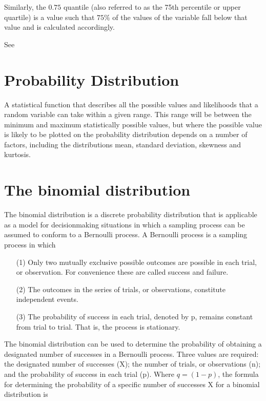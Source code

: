 \documentclass[12pt]{report}
\begin{document}
Similarly, the $0.75$ quantile (also referred to as the 75th percentile or upper quartile) is a value such that $75\%$ of the values of the variable fall below that value and is calculated accordingly.

See



\section{Probability Distribution}

A statistical function that describes all the possible values and likelihoods that a random variable can take within a given range. This range will be between the minimum and maximum statistically possible values, but where the possible value is likely to be plotted on the probability distribution depends on a number of factors, including the distributions mean, standard deviation, skewness and kurtosis.



\section{The binomial distribution }

The binomial distribution  is a discrete probability distribution that is applicable as a model for decisionmaking
situations in which a sampling process can be assumed to conform to a Bernoulli process. A Bernoulli
process is a sampling process in which
\begin{itemize}
\item[(1)] Only two mutually exclusive possible outcomes are possible in each trial, or observation. For
convenience these are called success and failure.
\item[(2)] The outcomes in the series of trials, or observations, constitute independent events.
\item[(3)] The probability of success in each trial, denoted by p, remains constant from trial to trial. That is,
the process is stationary.
\end{itemize}

The binomial distribution can be used to determine the probability of obtaining a designated number of
successes in a Bernoulli process. Three values are required: the designated number of successes (X); the number
of trials, or observations (n); and the probability of success in each trial (p). Where $q = (1 - p)$, the formula for
determining the probability of a specific number of successes X for a binomial distribution is
\end{document}
